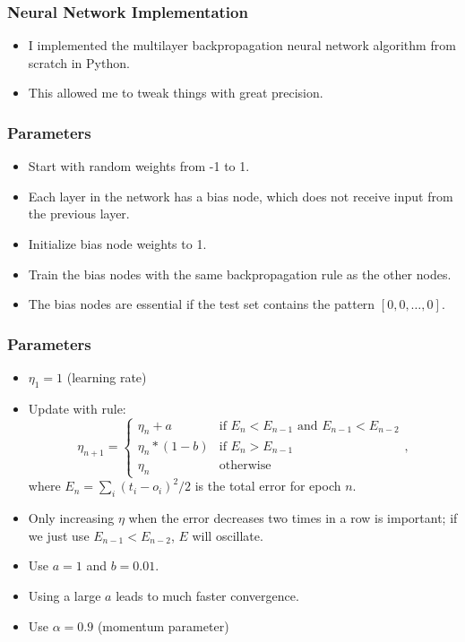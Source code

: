 \documentclass{beamer}
\numberwithin{equation}{section} %
\begin{document}
\begin{frame}
    \frametitle{Neural Network Implementation}
    \begin{itemize}
        \item I implemented the multilayer backpropagation neural network algorithm from scratch in Python.
        \pause
        \item This allowed me to tweak things with great precision.
    \end{itemize}
\end{frame}

\begin{frame}
    \frametitle{Parameters}
    \begin{itemize}
        \item Start with random weights from -1 to 1.
        \pause
        \item Each layer in the network has a bias node, which does not receive input from the previous layer.
        \pause
        \item Initialize bias node weights to 1.
        \pause
        \item Train the bias nodes with the same backpropagation rule as the other nodes.
        \pause
        \item The bias nodes are essential if the test set contains the pattern $[0, 0, \ldots, 0]$.
    \end{itemize}
\end{frame}

\begin{frame}
    \frametitle{Parameters}
    \begin{itemize}
        \item $\eta_1 = 1$ (learning rate)
        \pause
        \item Update with rule:
        \begin{equation}
            \eta_{n+1} =
            \begin{cases}
               \eta_n + a & \text{if } E_n < E_{n - 1} \text{ and } E_{n - 1} < E_{n - 2} \\
               \eta_n*(1 - b) & \text{if }E_n > E_{n - 1} \\
               \eta_n & \text{otherwise}
          \end{cases},
        \end{equation}
        where $E_n=\sum_i{(t_i - o_i)^2}/2$ is the total error for epoch $n$.
        \pause
        \item Only increasing $\eta$ when the error decreases two times in a row is important; if we just use $E_{n - 1} < E_{n - 2}$, $E$ will oscillate.
        \pause
        \item Use $a=1$ and $b=0.01$.
        \pause
        \item Using a large $a$ leads to much faster convergence.
        \pause
        \item Use $\alpha = 0.9$ (momentum parameter)
    \end{itemize}
\end{frame}
\end{document}
